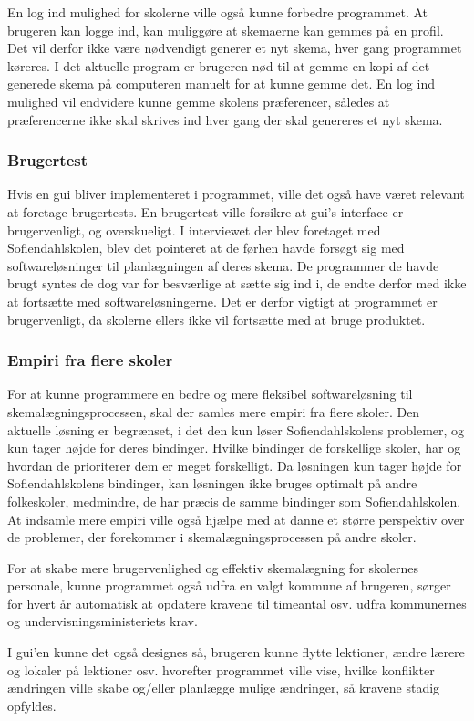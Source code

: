 En log ind mulighed for skolerne ville også kunne forbedre programmet. At brugeren kan logge ind, kan muliggøre at skemaerne kan gemmes på en profil. Det vil derfor ikke være nødvendigt generer et nyt skema, hver gang programmet køreres. I det aktuelle program er brugeren nød til at gemme en kopi af det generede skema på computeren manuelt for at kunne gemme det. En log ind mulighed vil endvidere kunne gemme skolens præferencer, således at præferencerne ikke skal skrives ind hver gang der skal genereres et nyt skema. 
\subsubsection{Brugertest}

Hvis en gui bliver implementeret i programmet, ville det også have været relevant at foretage brugertests. En brugertest ville forsikre at gui’s interface er brugervenligt, og overskueligt. I interviewet der blev foretaget med Sofiendahlskolen, blev det pointeret at de førhen havde forsøgt sig med softwareløsninger til planlægningen af deres skema. De programmer de havde brugt syntes de dog var for besværlige at sætte sig ind i, de endte derfor med ikke at fortsætte med softwareløsningerne. Det er derfor vigtigt at programmet er brugervenligt, da skolerne ellers ikke vil fortsætte med at bruge produktet. 
\subsubsection{Empiri fra flere skoler}

For at kunne programmere en bedre og mere fleksibel softwareløsning til skemalægningsprocessen, skal der samles mere empiri fra flere skoler. Den aktuelle løsning er begrænset, i det den kun løser Sofiendahlskolens problemer, og kun tager højde for deres bindinger. Hvilke bindinger de forskellige skoler, har og hvordan de prioriterer dem er meget forskelligt. Da løsningen kun tager højde for Sofiendahlskolens bindinger, kan løsningen ikke bruges optimalt på andre folkeskoler, medmindre, de har præcis de samme bindinger som Sofiendahlskolen. At indsamle mere empiri ville også hjælpe med at danne et større perspektiv over de problemer, der forekommer i skemalægningsprocessen på andre skoler. 

For at skabe mere brugervenlighed og effektiv skemalægning for skolernes personale, kunne programmet også udfra en valgt kommune af brugeren, sørger for hvert år automatisk at opdatere kravene til timeantal osv. udfra kommunernes og undervisningsministeriets krav.

I gui'en kunne det også designes så, brugeren kunne flytte lektioner, ændre lærere og lokaler på lektioner osv. hvorefter programmet ville vise, hvilke konflikter ændringen ville skabe og/eller planlægge mulige ændringer, så kravene stadig opfyldes.
